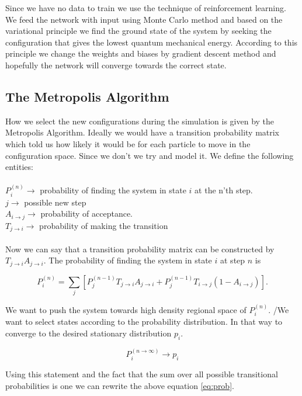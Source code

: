 Since we have no data to train we use the technique of reinforcement learning. We feed the network with input using Monte Carlo method and based on the variational principle we find the ground state of the system by seeking the configuration that gives the lowest quantum mechanical energy. According to this principle we change the weights and biases by gradient descent method and hopefully the network will converge towards the correct state. 

\subsection{The Metropolis Algorithm}

How we select the new configurations during the simulation is given by the Metropolis Algorithm. 
Ideally we would have a transition probability matrix which told us how likely it would be for each particle to move in the configuration space. Since we don't we try and model it.
We define the following entities:
\\
\\
$P_i^{(n)} \rightarrow$ probability of finding the system in state $i$ at the n'th step.
\\
$j \rightarrow$ possible new step
\\
$A_{i \rightarrow j} \rightarrow$ probability of acceptance. 
\\
$T_{j \rightarrow i} \rightarrow$ probability of making the transition  
\\
\\
Now we can say that a transition probability matrix can be constructed by $T_{j \rightarrow i}A_{j \rightarrow i}.$ The probability of finding the system in state $i$ at step $n$ is

\begin{equation}\label{eq:prob}
P_i^{(n)} = \sum_j \left[P_j^{(n-1)} T_{j \rightarrow i}A_{j \rightarrow i} + P_j^{(n-1)}T_{i \rightarrow j}(1 - A_{i \rightarrow j})\right].
\end{equation}

We want to push the system towards high density regional space of $P_i^{(n)}$. /We want to select states according to the probability distribution. In that way to converge to the desired stationary distribution $p_i$.

$$P_i^{(n \rightarrow \infty)} \rightarrow p_i$$

Using this statement and the fact that the sum over all possible transitional probabilities is one we can rewrite the above equation \ref{eq:prob}.


